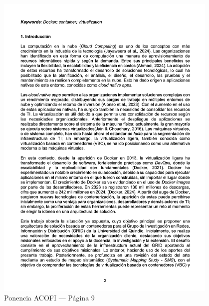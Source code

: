 \begin{figure}[H]
    \centering
    \begin{tcolorbox}[
        colback=white,
        colframe=gray!50,
        boxrule=1pt,
        arc=2pt,
        boxsep=5pt,
        left=3pt,
        right=3pt,
        top=3pt,
        bottom=3pt,
        drop shadow
    ]
        \includegraphics[width=0.95\textwidth,keepaspectratio]{apendices/ACOFI/pagina_9.png}
    \end{tcolorbox}
    \caption{Ponencia ACOFI --- Página 9}\label{fig:acofi-pagina-9}
\end{figure}
\FloatBarrier%
